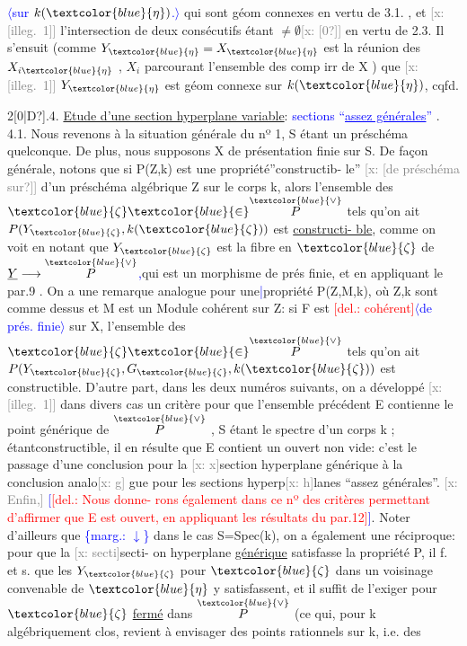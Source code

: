 \documentclass[11pt]{article}
\newcommand{\scanpage}[1]{\par\bigskip\noindent{\small\sffamily[scan #1]}\par}
\newcommand{\mspage}[1]{{\small\sffamily[p.\,#1]}}
\newcommand{\hand}[1]{\textcolor{blue}{#1}}
\newcommand{\inserted}[2][]{\textcolor{blue}{$\langle$#2$\rangle$}}
\newcommand{\margin}[1]{\textcolor{blue}{\{\textsf{marg.:} #1\}}}
\newcommand{\deleted}[1]{\textcolor{red}{[\textsf{del.:} #1]}}
\newcommand{\xout}[1]{\textcolor{gray}{[\textsf{x:} #1]}}
\newcommand{\uline}[1]{\underline{#1}}
\newcommand{\unsure}[1]{[#1?]}
\newcommand{\illegible}[1]{[\textsf{illeg.\ #1}]}
\begin{document}
\mspage{17}

\clearpage
\scanpage{25/18}
\mspage{15}

\inserted[typed]{sur $k(\hand{\eta})$.}
qui sont géom connexes en vertu de 3.1. , et \xout{\illegible{1}} l'intersection
de deux consécutifs étant $\neq \emptyset$\xout{\unsure{0}} en vertu de 2.3. Il s'ensuit (comme
$Y_{\hand{\eta}} = X_{\hand{\eta}}$ est la réunion des $X_{i\hand{\eta}}$ , $X_i$ parcourant l'ensemble des comp
irr de X ) que \xout{\illegible{1}} $Y_{\hand{\eta}}$ est géom connexe sur $k(\hand{\eta})$, cqfd.

2\unsure{0|D}.4. \uline{Etude d'une section hyperplane variable}: \hand{sections ``\uline{assez générales}''} .
4.1.
Nous revenons à la situation générale du nº 1, S étant un préschéma
quelconque. De plus, nous supposons X de présentation finie sur S.
De façon générale, notons que si P(Z,k) est une propriété''constructib-%
le'' \xout{\unsure{de préschéma sur}} d'un préschéma algébrique Z sur le corps k,
alors l'ensemble des $\hand{\zeta} \hand{\in} \overset{\hand{\vee}}{P}$ tels qu'on ait $P(Y_{\hand{\zeta}},k(\hand{\zeta}))$ est \uline{constructi-%
ble}, comme on voit en notant que $Y_{\hand{\zeta}}$ est la fibre en $\hand{\zeta}$ de $\underline{Y} \longrightarrow \overset{\hand{\vee}}{P}$\hand{,}qui
est un morphisme de prés finie, et en appliquant le par.9 . On a une
remarque analogue pour une\hand{|}propriété P(Z,M,k), où Z,k sont comme dessus
et M est un Module cohérent sur Z: si F est \deleted{cohérent}\inserted{de prés. finie} sur X, l'ensemble
des $\hand{\zeta} \hand{\in} \overset{\hand{\vee}}{P}$ tels qu'on ait $P(Y_{\hand{\zeta}},G_{\hand{\zeta}},k(\hand{\zeta}))$ est constructible. D'autre
part, dans les deux numéros suivants, on a développé \xout{\illegible{1}} dans divers
cas un critère pour que l'ensemble précédent E contienne le point
générique de $\overset{\hand{\vee}}{P}$ , S étant le spectre d'un corps k ; étantconstructible,
il en résulte que E contient un ouvert non vide: c'est le passage d'une
conclusion pour la \xout{x}section hyperplane générique à la conclusion analo\xout{g}
gue pour les sections hyperp\xout{h}lanes ``assez générales''. \xout{Enfin,} \hand{[}\deleted{Nous donne-%
rons également dans ce nº des critères permettant d'affirmer que E est
ouvert, en appliquant les résultats du par.12}\hand{]}. Noter d'ailleurs que \margin{$\downarrow$}
dans le cas S=Spec(k), on a également une réciproque: pour que la \xout{secti}secti-%
on hyperplane \uline{générique} satisfasse la propriété P, il f. et s. que
les $Y_{\hand{\zeta}}$ pour $\hand{\zeta}$ dans un voisinage convenable de $\hand{\eta}$ y satisfassent, et il
suffit de l'exiger pour $\hand{\zeta}$ \uline{fermé} dans $\overset{\hand{\vee}}{P}$ (ce qui, pour k algébriquement
clos, revient à envisager des points rationnels sur k, i.e. des
\end{document}
